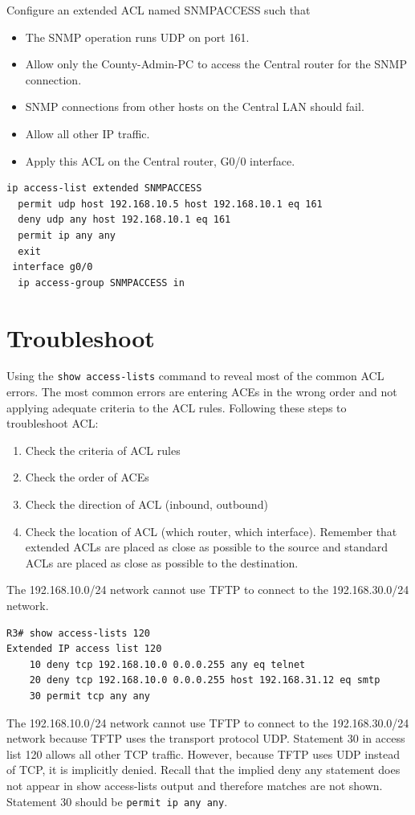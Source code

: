 \begin{example}
Configure an extended ACL named SNMPACCESS such that 
\begin{itemize}
\item The SNMP operation runs UDP on port 161.
\item Allow only the County-Admin-PC to access the Central router for the SNMP connection.
\item SNMP connections from other hosts on the Central LAN should fail.
\item Allow all other IP traffic.
\item Apply this ACL on the Central router, G0/0 interface.
\end{itemize}
\begin{verbatim}
ip access-list extended SNMPACCESS
  permit udp host 192.168.10.5 host 192.168.10.1 eq 161
  deny udp any host 192.168.10.1 eq 161
  permit ip any any
  exit
 interface g0/0
  ip access-group SNMPACCESS in
\end{verbatim}
\end{example}

\section{Troubleshoot}

Using the \texttt{show access-lists} command to reveal most of the common ACL errors. The most common errors are entering ACEs in the wrong order and not applying adequate criteria to the ACL rules. Following these steps to troubleshoot ACL:

\begin{enumerate}
\item Check the criteria of ACL rules
\item Check the order of ACEs
\item Check the direction of ACL (inbound, outbound)
\item Check the location of ACL (which router, which interface). Remember that extended ACLs are placed as close as possible to the source and standard ACLs are placed as close as possible to the destination.
\end{enumerate}

\begin{example}
The 192.168.10.0/24 network cannot use TFTP to connect to the 192.168.30.0/24 network.
\begin{verbatim}
R3# show access-lists 120
Extended IP access list 120
    10 deny tcp 192.168.10.0 0.0.0.255 any eq telnet
    20 deny tcp 192.168.10.0 0.0.0.255 host 192.168.31.12 eq smtp
    30 permit tcp any any
\end{verbatim}
The 192.168.10.0/24 network cannot use TFTP to connect to the 192.168.30.0/24 network because TFTP uses the transport protocol UDP. Statement 30 in access list 120 allows all other TCP traffic. However, because TFTP uses UDP instead of TCP, it is implicitly denied. Recall that the implied deny any statement does not appear in show access-lists output and therefore matches are not shown. Statement 30 should be \texttt{permit ip any any}.
\end{example}


